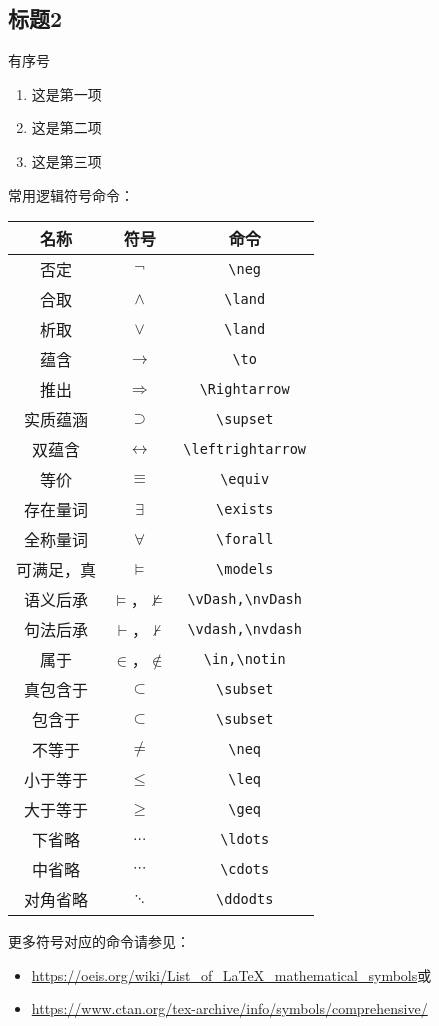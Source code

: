 \documentclass[UTF8,12pt]{article} %
\theoremstyle{definition}
\begin{document}
\subsection{标题2}
有序号
\begin{enumerate}[ 1)]
    \item 这是第一项
    \item 这是第二项
    \item 这是第三项
\end{enumerate}

常用逻辑符号命令：
\begin{center}
\begin{tabular}{|c|c|c|}
\hline
名称      & 符号                   & 命令 \\
\hline
否定      & $\neg$                & \verb|\neg| \\
合取      & $\land$               & \verb|\land| \\
析取      & $\lor$                & \verb|\land| \\
蕴含      & $\to$                 & \verb|\to| \\
推出      & $\Rightarrow$         & \verb|\Rightarrow| \\
实质蕴涵   & $\supset$             & \verb|\supset| \\
双蕴含     & $\leftrightarrow$     & \verb|\leftrightarrow| \\
等价      & $\equiv$              & \verb|\equiv| \\
存在量词   & $\exists$             & \verb|\exists| \\
全称量词   & $\forall$             & \verb|\forall| \\
可满足，真  & $\models$            & \verb|\models| \\
语义后承   & $\vDash$，$\nvDash$   & \verb|\vDash,\nvDash| \\
句法后承   & $\vdash$，$\nvdash$   & \verb|\vdash,\nvdash| \\
属于      & $\in$，$\notin$       & \verb|\in,\notin| \\
真包含于   & $\subset$             & \verb|\subset| \\
包含于     & $\subset$            & \verb|\subset| \\
不等于     & $\neq$               & \verb|\neq| \\
小于等于   & $\leq$               & \verb|\leq| \\
大于等于   & $\geq$               & \verb|\geq| \\
下省略    & $\ldots$              & \verb|\ldots| \\
中省略    & $\cdots$              & \verb|\cdots| \\
对角省略  & $\ddots$              & \verb|\ddodts| \\
\hline 
\end{tabular}
\end{center}
更多符号对应的命令请参见：
\begin{itemize}
  \item \url{https://oeis.org/wiki/List_of_LaTeX_mathematical_symbols}或
  \item \url{https://www.ctan.org/tex-archive/info/symbols/comprehensive/}
\end{itemize}
\end{document}
